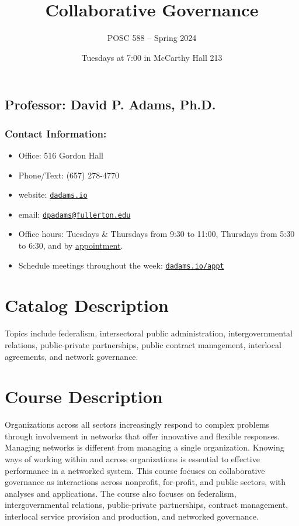 \documentclass[12pt, letterpaper]{article}
\begin{document}
    \title{Collaborative Governance}
    
    \author{POSC 588 -- Spring 2024}
    \date{Tuesdays at 7:00 in McCarthy Hall 213}
    
        \maketitle

\subsection*{Professor: David P. Adams, Ph.D.}

\subsubsection*{Contact Information:}

\begin{itemize}
	\item Office: 516 Gordon Hall
	\item Phone/Text: (657) 278-4770
	\item website: \href{https://dadams.io}{\texttt{dadams.io}}
	\item email: \href{dpadams@fullerton.edu}{\texttt{dpadams@fullerton.edu}}
	\item Office hours: Tuesdays \& Thursdays from 9:30 to 11:00, Thursdays from 5:30 to 6:30, and by \href{https://ly.dadams.io/appt}{appointment}.
	\item Schedule meetings throughout the week: \href{https://dadams.io/appt}{\texttt{dadams.io/appt}}
\end{itemize}


\section*{Catalog Description}

Topics include federalism, intersectoral public administration, intergovernmental relations, public-private partnerships, public contract management, interlocal agreements, and network governance.

\section*{Course Description}

Organizations across all sectors increasingly respond to complex problems through involvement in networks that offer innovative and flexible responses. Managing networks is different from managing a single organization. Knowing ways of working within and across organizations is essential to effective performance in a networked system. This course focuses on collaborative governance as interactions across nonprofit, for-profit, and public sectors, with analyses and applications. The course also focuses on federalism, intergovernmental relations, public-private partnerships, contract management, interlocal service provision and production, and networked governance.
\end{document}
